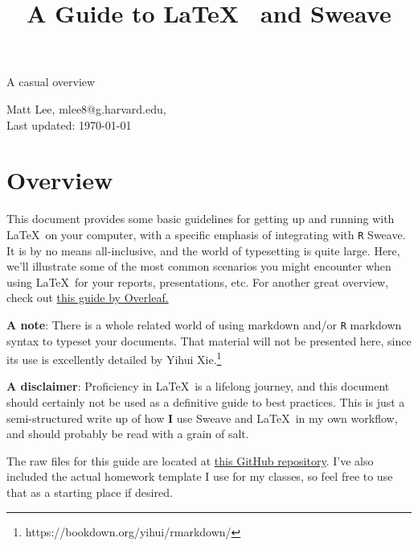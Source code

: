 \documentclass[11pt]{article}\usepackage[]{graphicx}\usepackage[]{color}
\title{\vspace{2cm} \textbf{A Guide to} \LaTeX\ \textbf{ and Sweave}}
\author{}
\date{\vspace{-2cm}}
\begin{document}
\maketitle

\begin{center}
\Large{A casual overview}

\large Matt Lee, mlee8@g.harvard.edu, \\ Last updated: \today
\end{center}

\vspace{1em}





\tableofcontents

\pagebreak


\section{Overview}

This document provides some basic guidelines for getting up and running with \LaTeX\ on your computer, with a specific emphasis of integrating with \texttt{R} Sweave. It is by no means all-inclusive, and the world of typesetting is quite large. Here, we'll illustrate some of the most common scenarios you might encounter when using \LaTeX\ for your reports, presentations, etc. For another great overview, check out \href{https://www.overleaf.com/learn/latex/Learn_LaTeX_in_30_minutes}{this guide by Overleaf.}

\textbf{A note}: There is a whole related world of using markdown and/or \texttt{R} markdown syntax to typeset your documents. That material will not be presented here, since its use is excellently detailed by Yihui Xie.\footnote{https://bookdown.org/yihui/rmarkdown/} 

\textbf{A disclaimer}: Proficiency in \LaTeX\ is a lifelong journey, and this document should certainly not be used as a definitive guide to best practices. This is just a semi-structured write up of how \textbf{I} use Sweave and \LaTeX\ in my own workflow, and should probably be read with a grain of salt. 

The raw files for this guide are located at \href{https://github.com/leem26/latex-intro}{this GitHub repository}. I've also included the actual homework template I use for my classes, so feel free to use that as a starting place if desired. 
\end{document}
